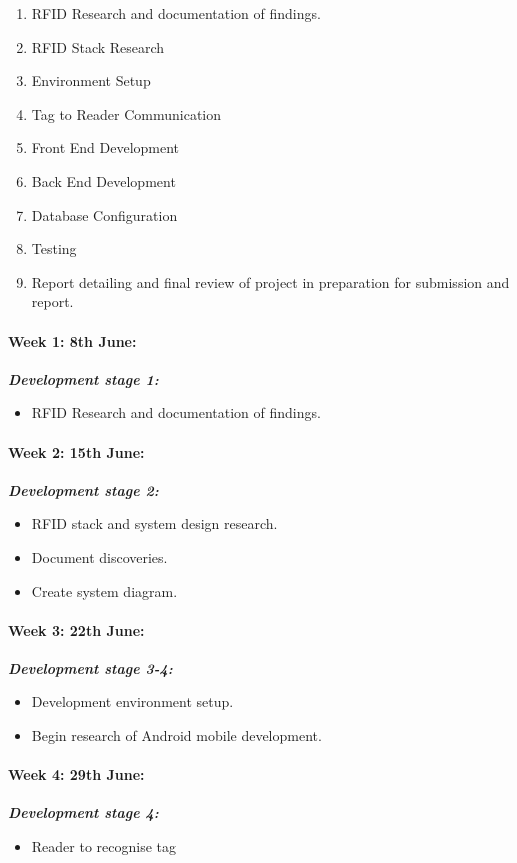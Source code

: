 \documentclass[a4paper, 11pt]{article}
\begin{document}
\begin{enumerate}
	\item RFID Research and documentation of findings.
	\item RFID Stack Research
	\item Environment Setup
	\item Tag to Reader Communication
	\item Front End Development
	\item Back End Development
	\item Database Configuration
	\item Testing
	\item Report detailing and final review of project in preparation for submission and report.
 \end{enumerate}

\iffalse
\paragraph{\textbf{Week 1: 8th June:	}} \textbf{\emph{Development stage 1:}}
\begin{itemize}
  \item  RFID Research and documentation of findings.
\end{itemize}

\paragraph{\textbf{Week 2: 15th June:}} \textbf{\emph{Development stage 2: }}
\begin{itemize}
  \item RFID stack and system design research.
  \item Document discoveries.
  \item Create system diagram. 
\end{itemize}

\paragraph{\textbf{Week 3: 22th June:}}  \textbf{\emph{Development stage 3-4: }}
\begin{itemize}
  \item Development environment setup. 
  \item Begin research of Android mobile development. 
\end{itemize}

\paragraph{\textbf{Week 4: 29th June:}}  \textbf{\emph{Development stage 4: }}
\begin{itemize}
  \item Reader to recognise tag
  \end{itemize}
\end{document}
